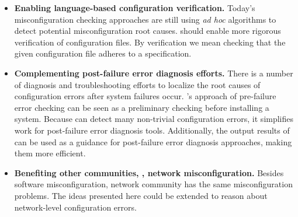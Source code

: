\begin{itemize}

\item {\bf Enabling language-based configuration verification.}
  Today's misconfiguration checking approaches are still using {\em ad hoc}
  algorithms to detect potential misconfiguration root causes. \app 
  should enable more rigorous verification of configuration files. By verification we
  mean checking that the given configuration file adheres to a
  specification.

\item {\bf Complementing post-failure error diagnosis efforts.}
  There is a number of diagnosis and troubleshooting efforts to localize
  the root causes of configuration errors after system failures occur.
  \app's approach of pre-failure error checking
  can be seen as a preliminary checking before installing a
  system. Because \app can detect many non-trivial
  configuration errors, it simplifies work for
  post-failure error diagnosis tools. Additionally, the output results
  of \app can be used as a guidance for post-failure
  error diagnosis approaches, making them more efficient.

\item {\bf Benefiting other communities, \eg, network misconfiguration.} 
  Besides software misconfiguration, network community has the same 
  misconfiguration problems. The ideas presented here could be extended to reason about
  network-level configuration errors.

\end{itemize}

